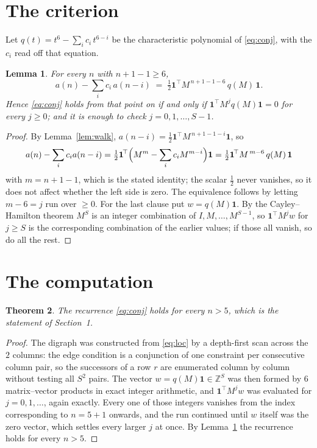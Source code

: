 \documentclass[11pt,a4paper]{article}
\theoremstyle{plain}
\newtheorem{theorem}{Theorem}
\newtheorem{lemma}[theorem]{Lemma}
\theoremstyle{definition}
\begin{document}
\section{The criterion}

Let $q(t)=t^{6}-\sum_i c_i\,t^{6-i}$ be the characteristic polynomial of
\eqref{eq:conj}, with the $c_i$ read off that equation.

\begin{lemma}\label{lem:crit}
For every $n$ with $n+1-1\ge6$,
\[
a(n)-\sum_i c_i\,a(n-i)\;=\;\tfrac1{2}\mathbf{1}^{\!\top}M^{\,n+1-1-6}\,q(M)\,\mathbf{1} .
\]
Hence \eqref{eq:conj} holds from that point on if and only if
$\mathbf{1}^{\!\top}M^{j}q(M)\mathbf{1}=0$ for every $j\ge0$; and it is enough to check
$j=0,1,\dots,S-1$.
\end{lemma}

\begin{proof}
By Lemma~\ref{lem:walk}, $a(n-i)=\tfrac1{2}\mathbf{1}^{\!\top}M^{\,n+1-1-i}\mathbf{1}$, so
\[
a(n)-\sum_i c_i a(n-i)
=\tfrac1{2}\mathbf{1}^{\!\top}\Bigl(M^{m}-\sum_i c_i M^{m-i}\Bigr)\mathbf{1}
=\tfrac1{2}\mathbf{1}^{\!\top}M^{\,m-6}\,q(M)\,\mathbf{1}
\]
with $m=n+1-1$, which is the stated identity; the scalar $\tfrac1{2}$ never vanishes, so
it does not affect whether the left side is zero. The equivalence follows by letting
$m-6=j$ run over $\ge0$. For the last clause put $w=q(M)\mathbf{1}$. By the
Cayley--Hamilton theorem $M^{S}$ is an integer combination of $I,M,\dots,M^{S-1}$, so
$\mathbf{1}^{\!\top}M^{j}w$ for $j\ge S$ is the corresponding combination of the earlier
values; if those all vanish, so do all the rest.
\end{proof}

\section{The computation}

\begin{theorem}
The recurrence \eqref{eq:conj} holds for every $n>5$, which is the statement of
Section~1.
\end{theorem}

\begin{proof}
The digraph was constructed from \eqref{eq:loc} by a depth-first scan across the $2$
columns: the edge condition is a conjunction of one constraint per consecutive column
pair, so the successors of a row $r$ are enumerated column by column without testing all
$S^2$ pairs. The vector $w=q(M)\mathbf{1}\in\mathbb{Z}^{S}$ was then formed by $6$
matrix--vector products in exact integer arithmetic, and $\mathbf{1}^{\!\top}M^{j}w$ was
evaluated for $j=0,1,\dots$, again exactly. Every one of those integers vanishes from the
index corresponding to $n=5+1$ onwards, and the run continued until $w$ itself was the
zero vector, which settles every larger $j$ at once. By Lemma~\ref{lem:crit} the recurrence
holds for every $n>5$.
\end{proof}
\end{document}
